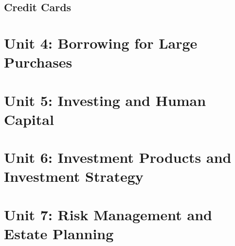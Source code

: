 \documentclass[12pt]{article}
\begin{document}
            \subsection{Credit Cards}

    \section{Unit 4: Borrowing for Large Purchases}

    \section{Unit 5: Investing and Human Capital}
    
    \section{Unit 6: Investment Products and Investment Strategy}

    \section{Unit 7: Risk Management and Estate Planning}
    
\end{document}
